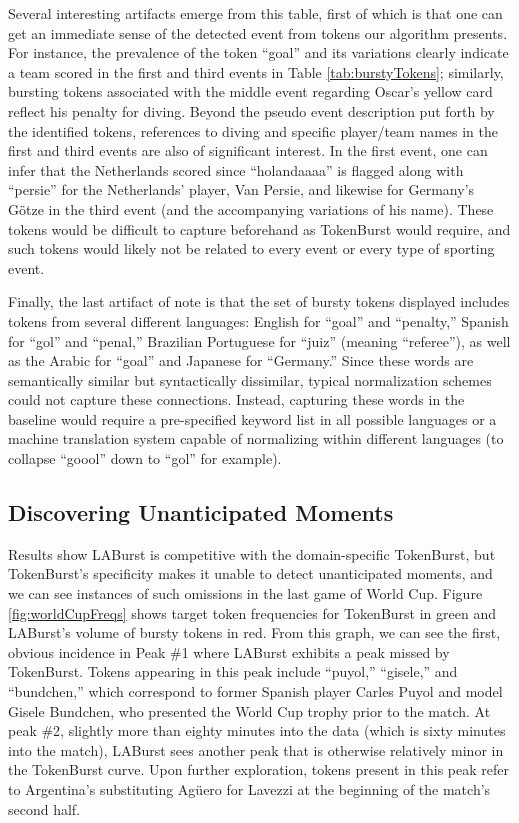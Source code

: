 \documentclass[letterpaper]{article}
\begin{document}
Several interesting artifacts emerge from this table, first of which is that one can get an immediate sense of the detected event from tokens our algorithm presents. 
For instance, the prevalence of the token ``goal'' and its variations clearly indicate a team scored in the first and third events in Table \ref{tab:burstyTokens}; similarly, bursting tokens associated with the middle event regarding Oscar's yellow card reflect his penalty for diving.
Beyond the pseudo event description put forth by the identified tokens, references to diving and specific player/team names in the first and third events are also of significant interest.
In the first event, one can infer that the Netherlands scored since ``holandaaaa'' is flagged along with ``persie'' for the Netherlands' player, Van Persie, and likewise for Germany's G\"{o}tze in the third event (and the accompanying variations of his name).
These tokens would be difficult to capture beforehand as TokenBurst would require, and such tokens would likely not be related to every event or every type of sporting event.

Finally, the last artifact of note is that the set of bursty tokens displayed includes tokens from several different languages: English for ``goal'' and ``penalty,'' Spanish for ``gol'' and ``penal,'' Brazilian Portuguese for ``juiz'' (meaning ``referee''), as well as the Arabic for ``goal'' and Japanese for ``Germany.''
Since these words are semantically similar but syntactically dissimilar, typical normalization schemes could not capture these connections.
Instead, capturing these words in the baseline would require a pre-specified keyword list in all possible languages or a machine translation system capable of normalizing within different languages (to collapse ``goool'' down to ``gol'' for example).

\subsection{Discovering Unanticipated Moments}
\label{sect:eventDiscovery}

Results show LABurst is competitive with the domain-specific TokenBurst, but TokenBurst's specificity makes it unable to detect unanticipated moments, and we can see instances of such omissions in the last game of World Cup.
Figure \ref{fig:worldCupFreqs} shows target token frequencies for TokenBurst in green and LABurst's volume of bursty tokens in red.
From this graph, we can see the first, obvious incidence in Peak \#1 where LABurst exhibits a peak  missed by TokenBurst.
Tokens appearing in this peak include ``puyol,'' ``gisele,'' and ``bundchen,'' which correspond to former Spanish player Carles Puyol and model Gisele Bundchen, who presented the World Cup trophy prior to the match.
At peak \#2, slightly more than eighty minutes into the data (which is sixty minutes into the match), LABurst sees another peak that is otherwise relatively minor in the TokenBurst curve.
Upon further exploration, tokens present in this peak refer to Argentina's substituting Ag\"{u}ero for Lavezzi at the beginning of the match's second half.
\end{document}
